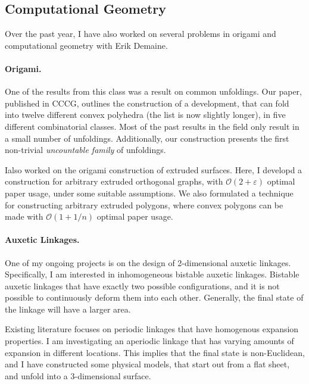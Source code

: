 \subsection*{Computational Geometry}

Over the past year, I have also worked on several problems in origami and computational geometry with Erik Demaine.

\paragraph{Origami.}
One of the results from this class was a result on common unfoldings.
Our paper\cite{common}, published in CCCG, outlines the construction of a development,
that can fold into twelve different convex polyhedra (the list is now slightly longer),
in five different combinatorial classes.
Most of the past results in the field \cite{box2, box2.5, box3, cube_tet, jz}
only result in a small number of unfoldings.
Additionally, our construction presents the first non-trivial \emph{uncountable family} of unfoldings.

Ialso worked on the origami construction of extruded surfaces.
Here, I developd a construction for arbitrary extruded orthogonal graphs,
with $ \mathcal{O}(2+\varepsilon) $ optimal paper usage, under some suitable assumptions.
We also formulated a technique for constructing arbitrary extruded polygons,
where convex polygons can be made with $ \mathcal{O}(1+1/n) $ optimal paper usage.

\paragraph{Auxetic Linkages.}
One of my ongoing projects is on the design of 2-dimensional auxetic linkages.
Specifically, I am interested in inhomogeneous bistable auxetic linkages.
Bistable auxetic linkages that have exactly two possible configurations,
and it is not possible to continuously deform them into each other.
Generally, the final state of the linkage will have a larger area.

Existing literature focuses on periodic linkages that have homogenous expansion properties.
I am investigating an aperiodic linkage that has varying amounts of expansion in different locations.
This implies that the final state is non-Euclidean, and I have constructed some physical models,
that start out from a flat sheet, and unfold into a 3-dimensional surface.

